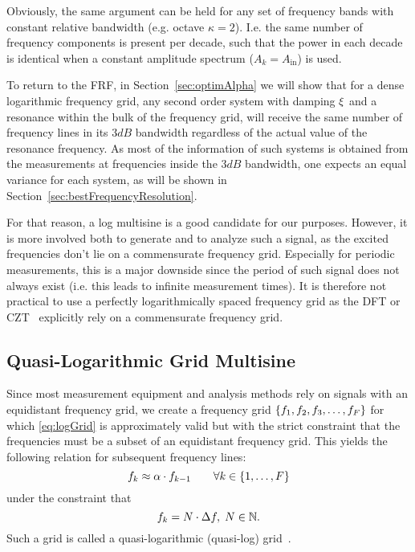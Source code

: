    Obviously, the same argument can be held for any set of frequency bands with constant relative bandwidth (e.g. octave $\kappa = 2$).
   I.e. the same number of frequency components is present per decade, such that the power in each decade is identical when a constant amplitude spectrum ($A_k = A_{\mathrm{in}}$) is used.   

  To return to the FRF, in Section~\ref{sec:optimAlpha} we will show that for a dense logarithmic frequency grid, any second order system with damping $\xi$ and a resonance within the bulk of the frequency grid, will receive the same number of frequency lines in its $3 \unit{dB}$ bandwidth regardless of the actual value of the resonance frequency.
  As most of the information of such systems is obtained from the measurements at frequencies inside the $3 \unit{dB}$
  bandwidth, one expects an equal variance for each system, as will be shown in Section~\ref{sec:bestFrequencyResolution}.
  
  For that reason, a log multisine is a good candidate for our purposes.
  However, it is more involved both to generate and to analyze such a signal, as the excited frequencies don't lie on a commensurate frequency grid.
  Especially for periodic measurements, this is a major downside since the period of such signal does not always exist (i.e. this leads to infinite measurement times).
  It is therefore not practical to use a perfectly logarithmically spaced frequency grid as the \gls{DFT} or \gls{CZT}~\citep{Rabiner2004} explicitly rely on a commensurate frequency grid.
  
\subsection{Quasi-Logarithmic Grid Multisine}
  Since most measurement equipment and analysis methods rely on signals with an equidistant frequency grid, we create a frequency grid
  $\left\{f_1, f_2, f_3,\ldots, f_F\right\}$ for which \eqref{eq:logGrid} is approximately  valid but with the strict constraint that the frequencies must be a subset  of an equidistant frequency grid. 
  This yields the following relation for  subsequent frequency lines:
  \begin{equation}
    f_k \approx \alpha \cdot f_{k-1}
    \qquad \forall k \in \left\{1,\ldots,F\right\}
  \label{eq:qlogGrid}
  \end{equation}
  under the constraint that
  \begin{equation}
    f_k = N \cdot \Delta f,\; N \in \mathbb{N}
    \text{.}
    \label{eq:constraintLinGrid}
  \end{equation}
  Such a grid is called a quasi-logarithmic (quasi-log) grid~\citep{Pintelon2012}. 

